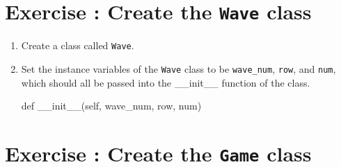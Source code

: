 \documentclass{42-en}
\begin{document}
\chapter{Exercise \exercicenumber: Create the \texttt{Wave} class}

\exnumber{\exercicenumber}

\makeheaderfiles

   \begin{enumerate}\itemsep7pt
    \item Create a class called \texttt{Wave}.
    \item Set the instance variables of the \texttt {Wave} class to be \texttt{wave\_num}, \texttt{row}, and \texttt{num}, which should all be passed into the \_\_init\_\_ function of the class.
\begin{42pycode}
def __init__(self, wave_num, row, num)
\end{42pycode}
\end{enumerate}
\nextexercice
\chapter{Exercise \exercicenumber: Create the \texttt{Game} class}

\exnumber{\exercicenumber}
\end{document}
